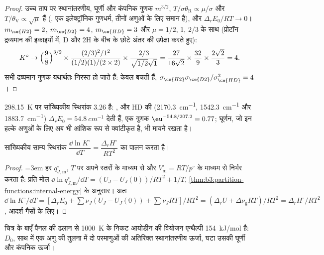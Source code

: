 \begin{proof}
उच्च ताप पर स्थानांतरणीय, घूर्णी और कंपनिक गुणक
$m^{3/2}$, $T/\sigma\theta_{\mathrm R} \propto \mu/\sigma$ और $T/\theta_{\mathrm V} \propto \sqrt\mu$ हैं (, एक
इलेक्ट्रॉनिक गुणधर्म, तीनों अणुओं के लिए समान है), और $\Delta_rE_0/RT \to 0$।
$m_{\ce{H2}} = 2$, $m_{\ce{D2}} = 4$, $m_{\ce{HD}} = 3$ और $\mu = 1/2$, 1, $2/3$ के साथ (प्रोटॉन
द्रव्यमान की इकाइयों में, D और 2H के बीच के छोटे अंतर की उपेक्षा करते हुए):
\[
  K^\circ \to \Bigl(\frac{9}{8}\Bigr)^{3/2} \times \frac{(2/3)^2/1^2}{(1/2)(1)/(2 \times 2)}
  \times \frac{2/3}{\sqrt{1/2}\sqrt1}
  = \frac{27}{16\sqrt2} \times \frac{32}{9} \times \frac{2\sqrt2}{3} = 4 .
\]
सभी द्रव्यमान गुणक यथार्थतः निरस्त हो जाते हैं: केवल  बचती हैं, $\sigma_{\ce{H2}}
\sigma_{\ce{D2}}/\sigma_{\ce{HD}}^2 = 4$।
\end{proof}

\qty{298.15}{K} पर सांख्यिकीय स्थिरांक 3.26 है: ,
 और HD की  (\qty{2170.3}{cm^{-1}}, \qty{1542.3}{cm^{-1}} और \qty{1883.7}{cm^{-1}}) $\Delta_rE_0 =
\qty{54.8}{cm^{-1}}$ देती हैं, एक गुणक $\eu^{-54.8/207.2} = 0.77$; घूर्णन, जो इन हल्के अणुओं के लिए
अब भी आंशिक रूप से क्वांटीकृत है, भी मायने रखता है।

\begin{proposition}[वांट हॉफ़ समीकरण की पुनःप्राप्ति]\label{prop:b3:statistical-thermo-applied:vant-hoff-stat}
सांख्यिकीय साम्य स्थिरांक $\dfrac{\dd\ln K^\circ}{\dd T} = \dfrac{\Delta_rH^\circ}{RT^2}$ का पालन करता है।
\end{proposition}

\begin{proof}
\emergencystretch=3em हर $q^\circ_{J,\mathrm m}$, $T$ पर अपने स्तरों के माध्यम से और $V^\circ_{\mathrm m} = RT/p^\circ$ के माध्यम से निर्भर करता है:
प्रति मोल $\dd\ln q^\circ_{J,\mathrm m}/\dd T = (U_J - U_J(0))/RT^2 + 1/T$,
\cref{thm:b3:partition-functions:internal-energy} के अनुसार। अतः $\dd\ln K^\circ/\dd T =
[\Delta_rE_0 + \sum\nu_J(U_J - U_J(0)) + \sum\nu_JRT]/RT^2 = (\Delta_rU + \Delta\nu_{\mathrm g}RT)/RT^2 =
\Delta_rH^\circ/RT^2$, आदर्श गैसों के लिए।
\end{proof}

चित्र के बाएँ पैनल की ढलान से \qty{1000}{K} के निकट आयोडीन की वियोजन
एन्थैल्पी \qty{154}{kJ/mol} है: $D_0$, साथ में एक अणु की तुलना में दो परमाणुओं की अतिरिक्त
स्थानांतरणीय ऊर्जा, घटा उसकी घूर्णी और कंपनिक
ऊर्जा।


